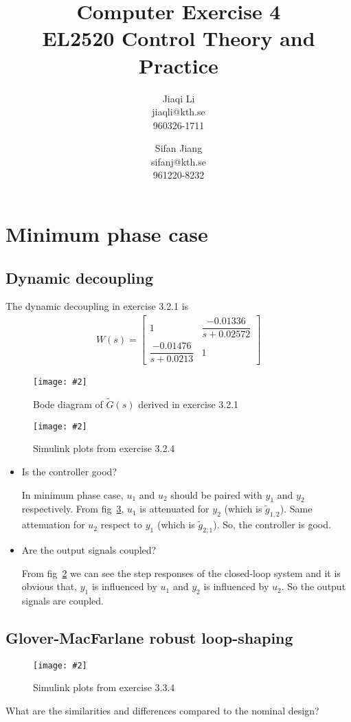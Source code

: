 \documentclass[11pt,a4paper]{article}
\title{
	Computer Exercise 4\\
	EL2520 Control Theory and Practice
}
\author{
	Jiaqi Li\\
	jiaqli@kth.se\\
	960326-1711
	\and
	Sifan Jiang\\
	sifanj@kth.se\\
	961220-8232
}
\newcommand{\image}[3]{
	\begin{figure}[!ht]
		\centering
	    \texttt{[image: \#2]}
		\caption{#3}
		\label{fig:#2}
	\end{figure}
}
\begin{document}
\maketitle


\section*{Minimum phase case}
\subsection*{Dynamic decoupling}
\par The dynamic decoupling in exercise 3.2.1 is
	\begin{align*}
		W(s) = \begin{bmatrix} 1 & \dfrac{-0.01336}{s+0.02572} \\ \dfrac{-0.01476}{s+0.0213} & 1 \end{bmatrix}
	\end{align*}
	
	\image{0.95}{321}{Bode diagram of $\tilde{G}(s)$ derived in exercise 3.2.1}
	\image{0.95}{324}{Simulink plots from exercise 3.2.4}

	\begin{itemize}
		\item Is the controller good?
		\par In minimum phase case, $u_{1}$ and $u_{2}$ should be paired with $y_{1}$ and $y_{2}$ respectively. From fig~\ref{fig:321}, $u_{1}$ is attenuated for $y_{2}$ (which is $\tilde{g}_{1,2}$). Same attenuation for $u_{2}$ respect to $y_{1}$ (which is $\tilde{g}_{2,1}$). So, the controller is good.
		
		\item Are the output signals coupled?
		\par From fig~\ref{fig:324} we can see the step responses of the closed-loop system and it is obvious that, $y_{1}$ is influenced by $u_{1}$ and $y_{2}$ is influenced by $u_{2}$. So the output signals are coupled.
	\end{itemize}

\subsection*{Glover-MacFarlane robust loop-shaping}
	\image{0.5}{321}{Simulink plots from exercise 3.3.4}

\par What are the similarities and differences compared to the nominal design?
	\par\dotfill\par\dotfill
\end{document}
